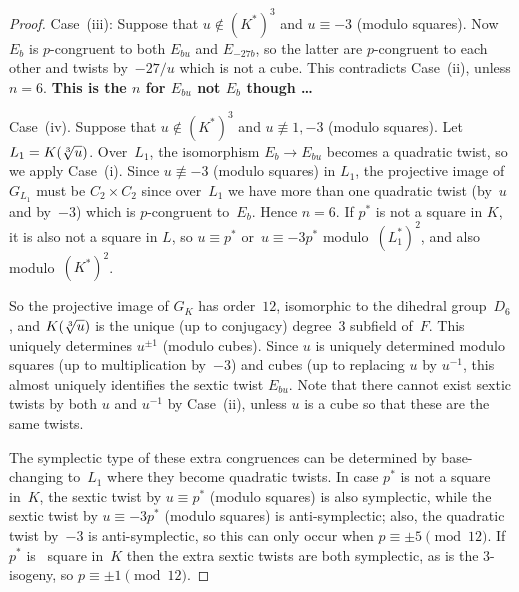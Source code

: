 \documentclass[12pt, reqno]{amsart}
\numberwithin{equation}{section}
\theoremstyle{definition}
\theoremstyle{remark}
\begin{document}
\begin{proof}
Case~(iii): Suppose that $u\not\in(K^*)^3$ and $u\equiv-3$ (modulo
squares).  Now $E_b$ is $p$-congruent to both $E_{bu}$ and $E_{-27b}$,
so the latter are $p$-congruent to each other and twists by~$-27/u$
which is not a cube.  This contradicts Case~(ii), unless $n=6$.
\textbf{This is the $n$ for $E_{bu}$ not $E_b$ though \dots}

Case~(iv).  Suppose that $u\not\in(K^*)^3$ and $u\not\equiv1,-3$
(modulo squares).  Let $L_1=K(\root3\of{u})$.  Over~$L_1$, the
isomorphism $E_b\to E_{bu}$ becomes a quadratic twist, so we apply
Case~(i).  Since $u\not\equiv-3$ (modulo squares) in $L_1$, the
projective image of $G_{L_1}$ must be $C_2\times C_2$ since over~$L_1$
we have more than one quadratic twist (by~$u$ and by~$-3$) which is
$p$-congruent to~$E_b$.  Hence $n=6$.  If $p^*$ is not a square in
$K$, it is also not a square in $L$, so $u\equiv p^*$
or~$u\equiv-3p^*$ modulo~$(L_1^*)^2$, and also modulo~$(K^*)^2$.

So the projective image of $G_K$ has order~$12$, isomorphic to the
dihedral group~$D_6$, and $K(\root3\of{u})$ is the unique (up to
conjugacy) degree~$3$ subfield of~$F$.  This uniquely determines
$u^{\pm1}$ (modulo cubes).  Since $u$ is uniquely determined modulo
squares (up to multiplication by~$-3$) and cubes (up to replacing $u$
by $u^{-1}$, this almost uniquely identifies the sextic twist
$E_{bu}$.  Note that there cannot exist sextic twists by both $u$ and
$u^{-1}$ by Case~(ii), unless $u$ is a cube so that these are the same
twists.

The symplectic type of these extra congruences can be determined by
base-changing to~$L_1$ where they become quadratic twists.  In case
$p^*$ is not a square in~$K$, the sextic twist by $u\equiv p^*$
(modulo squares) is also symplectic, while the sextic twist by
$u\equiv -3p^*$ (modulo squares) is anti-symplectic; also, the
quadratic twist by~$-3$ is anti-symplectic, so this can only occur
when $p\equiv\pm5\pmod{12}$.  If $p^*$ is \ square in~$K$ then the
extra sextic twists are both symplectic, as is the $3$-isogeny, so
$p\equiv\pm1\pmod{12}$.
\end{proof}
\end{document}
